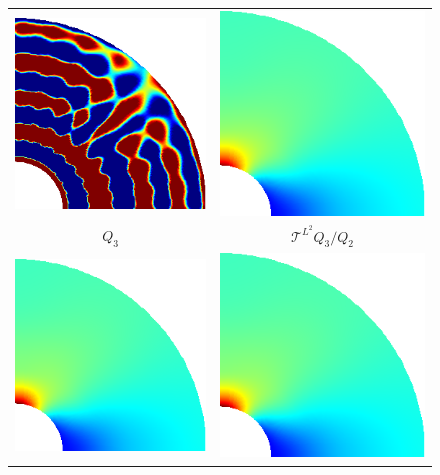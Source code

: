 \documentclass{article}
\begin{document}
\begin{figure}[htb!]
    \center
    \begin{tabular}{cc}
    \includegraphics[width=.4\linewidth]{no_stress_contour} & \includegraphics[width=.4\linewidth]{g_stress_contour}\\
    $Q_3$ & $\mathcal{T}^{L^2} Q_3/Q_2$\\
    \includegraphics[width=.4\linewidth]{s_stress_contour} & \includegraphics[width=.4\linewidth]{ns_stress_contour}\\

\end{tabular}
\end{figure}
\end{document}
